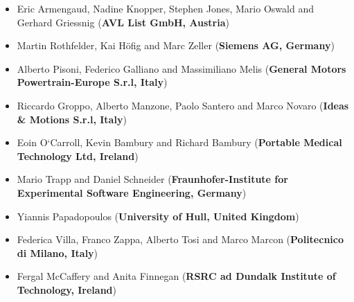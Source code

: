\documentclass[runningheads,a4paper]{llncs}
\begin{document}
\begin{itemize}
	\item Eric Armengaud, Nadine Knopper, Stephen Jones, Mario Oswald and Gerhard Griessnig (\textbf{AVL List GmbH, Austria})
	\item Martin Rothfelder, Kai H{\"o}fig and Marc Zeller (\textbf{Siemens AG, Germany})
	\item Alberto Pisoni, Federico Galliano and Massimiliano Melis (\textbf{General Motors Powertrain-Europe S.r.l, Italy})
	\item Riccardo Groppo, Alberto Manzone, Paolo Santero and Marco Novaro (\textbf{Ideas \& Motions S.r.l, Italy})
	\item Eoin O`Carroll, Kevin Bambury and Richard Bambury (\textbf{Portable Medical Technology Ltd, Ireland})
	\item Mario Trapp and Daniel Schneider (\textbf{Fraunhofer-Institute for Experimental Software Engineering, Germany})
	\item Yiannis Papadopoulos (\textbf{University of Hull, United Kingdom})
	\item Federica Villa, Franco Zappa, Alberto Tosi and Marco Marcon (\textbf{Politecnico di Milano, Italy})
	\item Fergal McCaffery and Anita Finnegan (\textbf{RSRC ad Dundalk Institute of Technology, Ireland})
\end{itemize}











 
  
\end{document}
